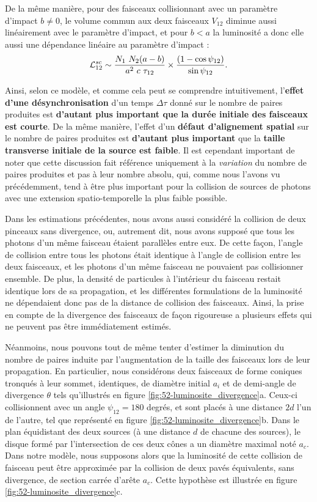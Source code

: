 \begin{refsection}
De la même manière, pour des faisceaux collisionnant avec un paramètre d'impact $b\neq 0$, le volume commun aux deux faisceaux $V_{12}$ diminue aussi linéairement avec le paramètre d'impact, et pour $b<a$ la luminosité a donc elle aussi une dépendance linéaire au paramètre d'impact :
\begin{equation}
    \mathcal{L}_{12}^{sc} \sim \dfrac{N_1 ~ N_2 (a-b)}{a^2 ~ c ~ \tau_{12}} \times \dfrac{(1-\cos{\psi_{12}})}{\sin{\psi_{12}}}\rm .
    \label{eq:52-luminosite_parametre_impact}
\end{equation}

Ainsi, selon ce modèle, et comme cela peut se comprendre intuitivement, l'\textbf{effet d'une désynchronisation} d'un temps $\Delta \tau$ donné sur le nombre de paires produites est \textbf{d'autant plus important que la durée initiale des faisceaux est courte}. De la même manière, l'effet d'un \textbf{défaut d'alignement spatial} sur le nombre de paires produites est \textbf{d'autant plus important} que la \textbf{taille transverse initiale de la source est faible}. Il est cependant important de noter que cette discussion fait référence uniquement à la \textit{variation} du nombre de paires produites et pas à leur nombre absolu, qui, comme nous l'avons vu précédemment, tend à être plus important pour la collision de sources de photons avec une extension spatio-temporelle la plus faible possible.

Dans les estimations précédentes, nous avons aussi considéré la collision de deux pinceaux sans divergence, ou, autrement dit, nous avons supposé que tous les photons d'un même faisceau étaient parallèles entre eux. De cette façon, l'angle de collision entre tous les photons était identique à l'angle de collision entre les deux faisceaux, et les photons d'un même faisceau ne pouvaient pas collisionner ensemble. De plus, la densité de particules à l'intérieur du faisceau restait identique lors de sa propagation, et les différentes formulations de la luminosité ne dépendaient donc pas de la distance de collision des faisceaux. Ainsi, la prise en compte de la divergence des faisceaux de façon rigoureuse a plusieurs effets qui ne peuvent pas être immédiatement estimés.

Néanmoins, nous pouvons tout de même tenter d'estimer la diminution du nombre de paires induite par l'augmentation de la taille des faisceaux lors de leur propagation. En particulier, nous considérons deux faisceaux de forme coniques tronqués à leur sommet, identiques, de diamètre initial $a_i$ et de demi-angle de divergence $\theta$ tels qu'illustrés en figure \ref{fig:52-luminosite_divergence}a. Ceux-ci collisionnent avec un angle $\psi_{12}=180$ degrés, et sont placés à une distance $2 d$ l'un de l'autre, tel que représenté en figure \ref{fig:52-luminosite_divergence}b. Dans le plan équidistant des deux sources (à une distance $d$ de chacune des sources), le disque formé par l'intersection de ces deux cônes a un diamètre maximal noté $a_c$. Dans notre modèle, nous supposons alors que la luminosité de cette collision de faisceau peut être approximée par la collision de deux pavés équivalents, sans divergence, de section carrée d’arête $a_c$. Cette hypothèse est illustrée en figure \ref{fig:52-luminosite_divergence}c.


\end{refsection}
